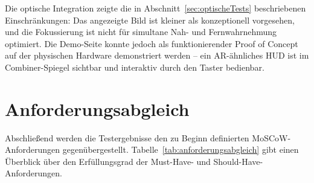 Die optische Integration zeigte die in Abschnitt~\ref{sec:optischeTests} beschriebenen
Einschränkungen: Das angezeigte Bild ist kleiner als konzeptionell vorgesehen, und
die Fokussierung ist nicht für simultane Nah- und Fernwahrnehmung optimiert.
Die Demo-Seite konnte jedoch als funktionierender Proof of Concept auf der
physischen Hardware demonstriert werden -- ein AR-ähnliches HUD ist im Combiner-Spiegel
sichtbar und interaktiv durch den Taster bedienbar.

\section{Anforderungsabgleich}
\label{sec:anforderungsabgleich}

Abschließend werden die Testergebnisse den zu Beginn definierten MoSCoW-Anforderungen
gegenübergestellt.
Tabelle~\ref{tab:anforderungsabgleich} gibt einen Überblick über den
Erfüllungsgrad der Must-Have- und Should-Have-Anforderungen.

